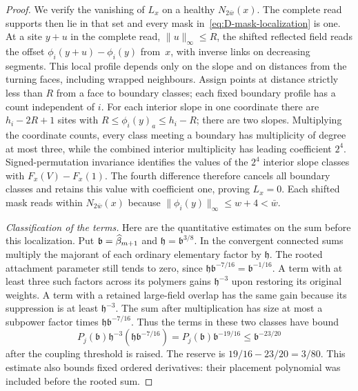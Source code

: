 \begin{proof}
We verify the vanishing of $L_x$ on a healthy $N_{2\bar w}(x)$. The complete read supports then lie in that set and every mask in~\eqref{eq:D-mask-localization} is one. At a site $y+u$ in the complete read, $\|u\|_\infty\le R$, the shifted reflected field reads the offset $\phi_i(y+u)-\phi_i(y)$ from~$x$, with inverse links on decreasing segments. This local profile depends only on the slope and on distances from the turning faces, including wrapped neighbours. Assign points at distance strictly less than $R$ from a face to boundary classes; each fixed boundary profile has a count independent of $i$. For each interior slope in one coordinate there are $h_i-2R+1$ sites with $R\le\phi_i(y)_a\le h_i-R$; there are two slopes. Multiplying the coordinate counts, every class meeting a boundary has multiplicity of degree at most three, while the combined interior multiplicity has leading coefficient $2^4$. Signed-permutation invariance identifies the values of the $2^4$ interior slope classes with $F_x(V)-F_x(1)$. The fourth difference therefore cancels all boundary classes and retains this value with coefficient one, proving $L_x=0$. Each shifted mask reads within $N_{2\bar w}(x)$ because $\|\phi_i(y)\|_\infty\le w+4<\bar w$.

\emph{Classification of the terms.} Here are the quantitative estimates on the sum before this localization. Put $\mathfrak b=\widehat{\beta}_{m+1}$ and $\mathfrak h=\mathfrak b^{3/8}$. In the convergent connected sums multiply the majorant of each ordinary elementary factor by $\mathfrak h$. The rooted attachment parameter still tends to zero, since $\mathfrak h \mathfrak b^{-7/16}=\mathfrak b^{-1/16}$. A term with at least three such factors across its polymers gains $\mathfrak h^{-3}$ upon restoring its original weights. A term with a retained large-field overlap has the same gain because its suppression is at least $\mathfrak h^{-3}$. The sum after multiplication has size at most a subpower factor times $\mathfrak h \mathfrak b^{-7/16}$. Thus the terms in these two classes have bound
\begin{equation}\label{eq:D-height-gain}
P_j(\mathfrak b)\mathfrak h^{-3}(\mathfrak h \mathfrak b^{-7/16})=P_j(\mathfrak b)\mathfrak b^{-19/16}
\le \mathfrak b^{-23/20}
\end{equation}
after the coupling threshold is raised. The reserve is $19/16-23/20=3/80$. This estimate also bounds fixed ordered derivatives: their placement polynomial was included before the rooted sum.


\end{proof}
